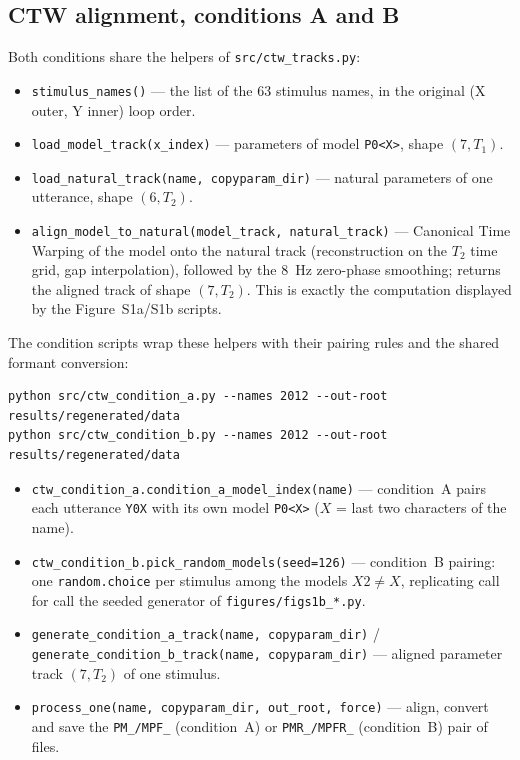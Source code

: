 \documentclass[11pt,a4paper]{article}
\begin{document}
\subsection{CTW alignment, conditions A and B}
Both conditions share the helpers of \texttt{src/ctw\_tracks.py}:
\begin{itemize}
\item \texttt{stimulus\_names()} --- the list of the 63 stimulus names,
      in the original (X outer, Y inner) loop order.
\item \texttt{load\_model\_track(x\_index)} --- parameters of model
      \texttt{P0<X>}, shape $(7, T_1)$.
\item \texttt{load\_natural\_track(name, copyparam\_dir)} --- natural
      parameters of one utterance, shape $(6, T_2)$.
\item \texttt{align\_model\_to\_natural(model\_track, natural\_track)} ---
      Canonical Time Warping of the model onto the natural track
      (reconstruction on the $T_2$ time grid, gap interpolation),
      followed by the 8~Hz zero-phase smoothing; returns the aligned
      track of shape $(7, T_2)$. This is exactly the computation
      displayed by the Figure~S1a/S1b scripts.
\end{itemize}
The condition scripts wrap these helpers with their pairing rules and
the shared formant conversion:
\begin{lstlisting}
python src/ctw_condition_a.py --names 2012 --out-root results/regenerated/data
python src/ctw_condition_b.py --names 2012 --out-root results/regenerated/data
\end{lstlisting}
\begin{itemize}
\item \texttt{ctw\_condition\_a.condition\_a\_model\_index(name)} ---
      condition~A pairs each utterance \texttt{Y0X} with its own model
      \texttt{P0<X>} ($X$ = last two characters of the name).
\item \texttt{ctw\_condition\_b.pick\_random\_models(seed=126)} ---
      condition~B pairing: one \texttt{random.choice} per stimulus among
      the models $X2 \neq X$, replicating call for call the seeded
      generator of \texttt{figures/figs1b\_*.py}.
\item \texttt{generate\_condition\_a\_track(name, copyparam\_dir)} /
      \texttt{generate\_condition\_b\_track(name, copyparam\_dir)} ---
      aligned parameter track $(7, T_2)$ of one stimulus.
\item \texttt{process\_one(name, copyparam\_dir, out\_root, force)} ---
      align, convert and save the \texttt{PM\_/MPF\_} (condition~A) or
      \texttt{PMR\_/MPFR\_} (condition~B) pair of files.
\end{itemize}
\end{document}
